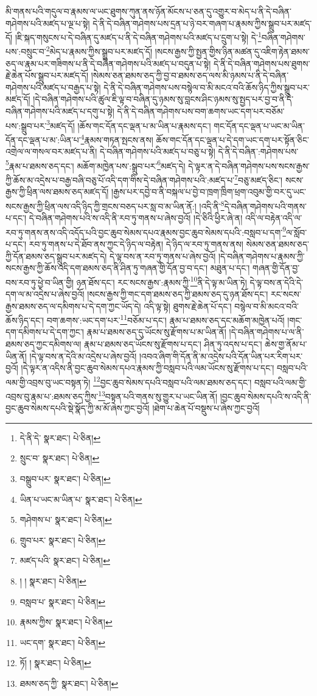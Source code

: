 མི་གནས་པའི་གདུལ་བ་རྣམས་ལ་ཡང་ཐུགས་ཀུན་ནས་ཉོན་མོངས་པ་ཅན་དུ་འགྱུར་བ་མེད་པ་ནི་དེ་བཞིན་གཤེགས་པའི་མཛད་པ་ལྔ་པ་སྟེ། དེ་ནི་དེ་བཞིན་གཤེགས་པས་དྲན་པ་ཉེ་བར་གཞག་པ་རྣམས་ཀྱིས་སྒྲུབ་པར་མཛད་དོ། །ཇི་སྐད་གསུངས་པ་དེ་བཞིན་དུ་མཛད་པ་ནི་དེ་བཞིན་གཤེགས་པའི་མཛད་པ་དྲུག་པ་སྟེ། དེ་\footnote{དེ་ནི་དེ་  སྣར་ཐང་།  པེ་ཅིན། }བཞིན་གཤེགས་པས་:བསྲུང་བ་\footnote{སྲུང་བ་  སྣར་ཐང་།  པེ་ཅིན། }མེད་པ་རྣམས་ཀྱིས་སྒྲུབ་པར་མཛད་དོ། །སངས་རྒྱས་ཀྱི་སྤྱན་གྱིས་ཉིན་མཚན་དུ་འཇིག་རྟེན་ཐམས་ཅད་ལ་རྣམ་པར་གཟིགས་པ་ནི་དེ་བཞིན་གཤེགས་པའི་མཛད་པ་བདུན་པ་སྟེ། དེ་ནི་དེ་བཞིན་གཤེགས་པས་ཐུགས་རྗེ་ཆེན་པོས་སྒྲུབ་པར་མཛད་དོ། །སེམས་ཅན་ཐམས་ཅད་ཀྱི་བྱ་བ་ཐམས་ཅད་ལས་མི་ཉམས་པ་ནི་དེ་བཞིན་གཤེགས་པའི་མཛད་པ་བརྒྱད་པ་སྟེ། དེ་ནི་དེ་བཞིན་གཤེགས་པས་བསྙེལ་བ་མི་མངའ་བའི་ཆོས་ཉིད་ཀྱིས་སྒྲུབ་པར་མཛད་དོ། །དེ་བཞིན་གཤེགས་པའི་ཚུལ་ཇི་ལྟ་བ་བཞིན་དུ་ཉམས་སུ་བླངས་ཤིང་ཉམས་སུ་སྤྱད་པར་བྱ་བ་ནི་དེ་བཞིན་གཤེགས་པའི་མཛད་པ་དགུ་པ་སྟེ། དེ་ནི་དེ་བཞིན་གཤེགས་པས་བག་ཆགས་ཡང་དག་པར་བཅོམ་པས་:སྒྲུབ་པར་\footnote{བསྒྲུབ་པར་  སྣར་ཐང་།  པེ་ཅིན། }མཛད་དོ། །ཆོས་གང་དོན་དང་ལྡན་པ་མ་ཡིན་པ་རྣམས་དང་། གང་དོན་དང་ལྡན་པ་ཡང་མ་ཡིན་དོན་དང་ལྡན་པ་མ་:ཡིན་པ་\footnote{ཡིན་པ་ཡང་མ་ཡིན་པ་  སྣར་ཐང་།  པེ་ཅིན། }རྣམས་གཏན་སྤངས་ནས། ཆོས་གང་དོན་དང་ལྡན་པ་དེ་དག་ཡང་དག་པར་སྟོན་ཅིང་འགྲེལ་ལ་གསལ་བར་མཛད་པ་ནི། དེ་བཞིན་གཤེགས་པའི་མཛད་པ་བཅུ་པ་སྟེ། དེ་ནི་དེ་བཞིན་:གཤེགས་པས་\footnote{གཤེགས་པ་  སྣར་ཐང་།  པེ་ཅིན། }རྣམ་པ་ཐམས་ཅད་དང་། མཆོག་མཁྱེན་པས་:སྒྲུབ་པར་\footnote{གྲུབ་པར་  སྣར་ཐང་།  པེ་ཅིན། }མཛད་དེ། དེ་ལྟར་ན་དེ་བཞིན་གཤེགས་པས་སངས་རྒྱས་ཀྱི་ཆོས་མ་འདྲེས་པ་བརྒྱ་བཞི་བཅུ་པོ་འདི་དག་གིས་དེ་བཞིན་གཤེགས་པའི་:མཛད་པ་\footnote{མཛད་པའི་  སྣར་ཐང་།  པེ་ཅིན། }བཅུ་མཛད་ཅིང་། སངས་རྒྱས་ཀྱི་ཕྲིན་ལས་ཐམས་ཅད་མཛད་དོ། །རྒྱས་པར་དབྱེ་བ་ནི་བསྐལ་པ་བྱེ་བ་ཁྲག་ཁྲིག་ཕྲག་འབུམ་གྱི་བར་དུ་ཡང་སངས་རྒྱས་ཀྱི་ཕྲིན་ལས་འདི་ཉིད་ཀྱི་གྲངས་བཅད་པར་སླ་བ་མ་ཡིན་ནོ:། །འདི་ནི་\footnote{། །  སྣར་ཐང་།  པེ་ཅིན། }དེ་བཞིན་གཤེགས་པའི་གནས་པ་དང་། དེ་བཞིན་གཤེགས་པའི་ས་འདི་ནི་རབ་ཏུ་གནས་པ་ཞེས་བྱའོ། །དེ་ཅིའི་ཕྱིར་ཞེ་ན། འདི་ལ་བརྟེན་འདི་ལ་རབ་ཏུ་གནས་ནས་འདི་འདོད་པའི་བྱང་ཆུབ་སེམས་དཔའ་རྣམས་བྱང་ཆུབ་སེམས་དཔའི་:བསླབ་པ་དག་\footnote{བསླབ་པ་  སྣར་ཐང་།  པེ་ཅིན། }ལ་སློབ་པ་དང་། རབ་ཏུ་གནས་པ་དེ་ཐོབ་ནས་ཀྱང་དེ་ཉིད་ལ་བརྟེན། དེ་ཉིད་ལ་རབ་ཏུ་གནས་ནས། སེམས་ཅན་ཐམས་ཅད་ཀྱི་དོན་ཐམས་ཅད་སྒྲུབ་པར་མཛད་དེ། དེ་ལྟ་བས་ན་རབ་ཏུ་གནས་པ་ཞེས་བྱའོ། །དེ་བཞིན་གཤེགས་པ་རྣམས་ཀྱི་སངས་རྒྱས་ཀྱི་ཆོས་འདི་དག་ཐམས་ཅད་ནི་ཤིན་ཏུ་གཞན་གྱི་དོན་བྱ་བ་དང་། མཐུན་པ་དང་། གཞན་གྱི་དོན་བྱ་བས་རབ་ཏུ་ཕྱེ་བ་ཡིན་གྱི། ཉན་ཐོས་དང་། རང་སངས་རྒྱས་:རྣམས་ཀྱི་\footnote{རྣམས་ཀྱིས་  སྣར་ཐང་།  པེ་ཅིན། }ནི་དེ་ལྟ་མ་ཡིན་ཏེ། དེ་ལྟ་བས་ན་དེའི་དེ་དག་ལ་མ་འདྲེས་པ་ཞེས་བྱའོ། །སངས་རྒྱས་ཀྱི་གང་དག་ཐམས་ཅད་ཀྱི་ཐམས་ཅད་དུ་ཉན་ཐོས་དང་། རང་སངས་རྒྱས་ཐམས་ཅད་ལ་དམིགས་པ་དེ་དག་ཀྱང་ཡོད་དེ། འདི་ལྟ་སྟེ། ཐུགས་རྗེ་ཆེན་པོ་དང་། བསྙེལ་བ་མི་མངའ་བའི་ཆོས་ཉིད་དང་། བག་ཆགས་:ཡང་དག་པར་\footnote{ཡང་དག་  སྣར་ཐང་།  པེ་ཅིན། }བཅོམ་པ་དང་། རྣམ་པ་ཐམས་ཅད་དང་མཆོག་མཁྱེན་པའོ། །གང་དག་དམིགས་པ་དེ་དག་ཀྱང་། རྣམ་པ་ཐམས་ཅད་དུ་ཡོངས་སུ་རྫོགས་པ་མ་ཡིན་ནོ། །དེ་བཞིན་གཤེགས་པ་ལ་ནི་ཐམས་ཅད་ཀྱང་དམིགས་ལ། རྣམ་པ་ཐམས་ཅད་ཡོངས་སུ་རྫོགས་པ་དང་། ཤིན་ཏུ་འདས་པ་དང་། ཆེས་གྱ་ནོམ་པ་ཡིན་ནོ། །དེ་ལྟ་བས་ན་དེའི་མ་འདྲེས་པ་ཞེས་བྱའོ། །འབའ་ཞིག་གི་དོན་ནི་མ་འདྲེས་པའི་དོན་ཡིན་པར་རིག་པར་བྱའོ། །དེ་ལྟར་ན་འདིས་ནི་བྱང་ཆུབ་སེམས་དཔའ་རྣམས་ཀྱི་བསླབ་པའི་ལམ་ཡོངས་སུ་རྫོགས་པ་དང་། བསླབ་པའི་ལམ་གྱི་འབྲས་བུ་ཡང་བསྟན་ཏེ། \footnote{ཏོ། །   སྣར་ཐང་།  པེ་ཅིན། }བྱང་ཆུབ་སེམས་དཔའི་བསླབ་པའི་ལམ་ཐམས་ཅད་དང་། བསླབ་པའི་ལམ་གྱི་འབྲས་བུ་རྣམ་པ་:ཐམས་ཅད་ཀྱིས་\footnote{ཐམས་ཅད་ཀྱི་  སྣར་ཐང་།  པེ་ཅིན། }བསྟན་པའི་གནས་སུ་གྱུར་པ་ཡང་ཡིན་ནོ། །བྱང་ཆུབ་སེམས་དཔའི་ས་འདི་ནི་བྱང་ཆུབ་སེམས་དཔའི་སྡེ་སྣོད་ཀྱི་མ་མོ་ཞེས་ཀྱང་བྱའོ། །ཐེག་པ་ཆེན་པོ་བསྡུས་པ་ཞེས་ཀྱང་བྱའོ། 